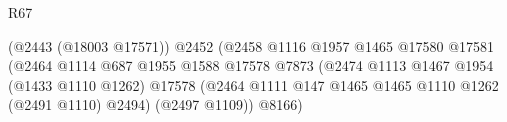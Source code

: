 \begin{lexlean}{R67}
\begin{coremodule}
                                                                      (@2443 (@18003 @17571))
                                                                      @2452
                                                                      (@2458
                                                                        @1116
                                                                        @1957
                                                                        @1465
                                                                        @17580
                                                                        @17581
                                                                        (@2464
                                                                          @1114
                                                                          @687
                                                                          @1955
                                                                          @1588
                                                                          @17578
                                                                          @7873
                                                                          (@2474
                                                                            @1113
                                                                            @1467
                                                                            @1954
                                                                            (@1433 @1110 @1262)
                                                                            @17578
                                                                            (@2464
                                                                              @1111
                                                                              @147
                                                                              @1465
                                                                              @1465
                                                                              @1110
                                                                              @1262
                                                                              (@2491 @1110)
                                                                              @2494)
                                                                            (@2497 @1109))
                                                                          @8166)

\end{coremodule}
\end{lexlean}
